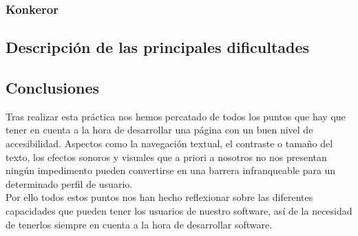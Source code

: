 \subsubsection{Konkeror}
\subsection{Descripción de las principales dificultades}
\subsection{Conclusiones}
Tras realizar esta práctica nos hemos percatado de todos los puntos que hay que tener en cuenta a la hora de desarrollar una página con un buen nivel de accesibilidad. Aspectos como la navegación textual, el contraste o tamaño del texto, los efectos sonoros y visuales que a priori a nosotros no nos presentan ningún impedimento pueden convertirse en una barrera infranqueable para un determinado perfil de usuario.\\
Por ello todos estos puntos nos han hecho reflexionar sobre las diferentes capacidades que pueden tener los usuarios de nuestro software, así de la necesidad de tenerlos siempre en cuenta a la hora de desarrollar software.